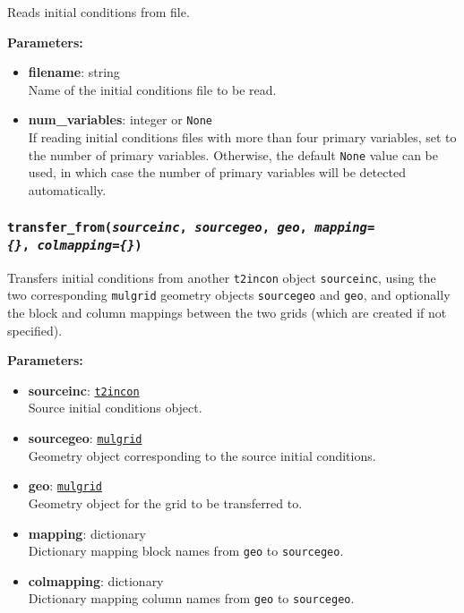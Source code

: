 Reads initial conditions from file.

\textbf{Parameters:}
\begin{itemize}
\item \textbf{filename}: string\\
  Name of the initial conditions file to be read.
\item \textbf{num\_variables}: integer or \texttt{None}\\
  If reading initial conditions files with more than four primary variables, set to the number of primary variables. Otherwise, the default \texttt{None} value can be used, in which case the number of primary variables will be detected automatically.
\end{itemize}

\begin{snugshade}
\subsubsection{\texttt{transfer\_from(\emph{sourceinc}, \emph{sourcegeo}, \emph{geo}, \emph{mapping=\{\}},\
    \emph{colmapping=\{\}})}}
\end{snugshade}
\label{sec:t2incon:transfer_from}

Transfers initial conditions from another \texttt{t2incon} object \texttt{sourceinc}, using the two corresponding \texttt{mulgrid} geometry objects \texttt{sourcegeo} and \texttt{geo}, and optionally the block and column mappings between the two grids (which are created if not specified).

\textbf{Parameters:}
\begin{itemize}
\item \textbf{sourceinc}: \hyperref[incons]{\texttt{t2incon}}\\
  Source initial conditions object.
\item \textbf{sourcegeo}: \hyperref[mulgrids]{\texttt{mulgrid}}\\
  Geometry object corresponding to the source initial conditions.
\item \textbf{geo}: \hyperref[mulgrids]{\texttt{mulgrid}}\\
  Geometry object for the grid to be transferred to.
\item \textbf{mapping}: dictionary\\
  Dictionary mapping block names from \texttt{geo} to \texttt{sourcegeo}.
\item \textbf{colmapping}: dictionary\\
  Dictionary mapping column names from \texttt{geo} to \texttt{sourcegeo}.
\end{itemize}


